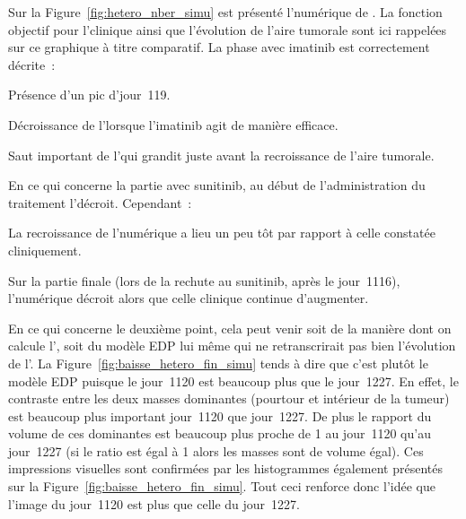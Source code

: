 \documentclass[main.tex]{subfiles}
\begin{document}
Sur la Figure~\ref{fig:hetero_nber_simu} est présenté l'\hetero numérique de \Nber.
La fonction objectif pour l'\hetero clinique ainsi que l'évolution de l'aire tumorale sont ici rappelées sur ce graphique à titre comparatif. La phase avec imatinib est  correctement décrite~:
\begin{myitemize}
\item Présence d'un pic d'\hetero jour~119.
\item Décroissance de l'\hetero lorsque l'imatinib agit de manière efficace.
\item Saut important de l'\hetero qui grandit juste avant la recroissance de l'aire tumorale.
\end{myitemize}
En ce qui concerne la partie avec sunitinib, au début de l'administration du traitement l'\hetero décroit. Cependant~:
\begin{myitemize}
\item La recroissance de l'\hetero numérique a lieu un peu tôt par rapport à celle constatée cliniquement.
\item Sur la partie finale (lors de la rechute au sunitinib, après le jour~1116), l'\hetero numérique décroit alors que celle clinique continue d'augmenter. 
\end{myitemize}
En ce qui concerne le deuxième point, cela peut venir soit de la manière dont on calcule l'\hetero, soit du modèle EDP lui même qui ne retranscrirait pas bien l'évolution de l'\hetero. La Figure~\ref{fig:baisse_hetero_fin_simu} tends à dire que c'est plutôt le modèle EDP puisque le jour~1120 est beaucoup plus \hetero que le 
jour~1227. En effet, le contraste entre les deux masses dominantes (pourtour et intérieur de la tumeur) 
est beaucoup plus important jour~1120 que jour~1227. De plus le rapport du volume de ces dominantes est beaucoup plus proche de 1 au jour~1120 qu'au jour~1227 (si le ratio est égal à 1 alors les masses sont de volume égal). Ces impressions visuelles sont confirmées par les histogrammes également présentés sur la Figure~\ref{fig:baisse_hetero_fin_simu}. 
Tout ceci renforce donc l'idée que l'image du jour~1120 est plus \hetero que celle du jour~1227.
\end{document}
